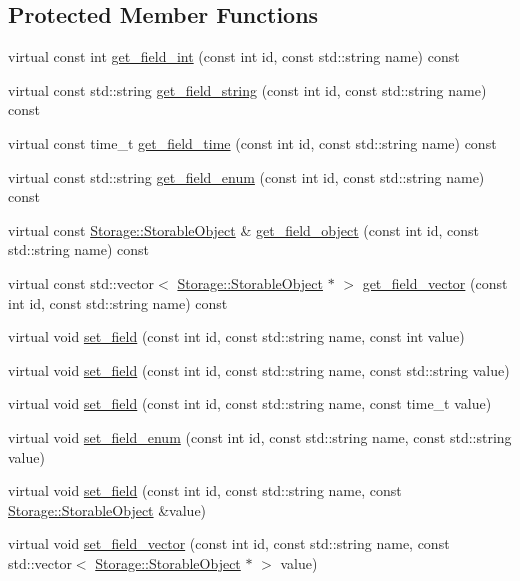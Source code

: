 \subsection*{Protected Member Functions}
\begin{DoxyCompactItemize}
\item 
virtual const int \hyperlink{classDummyStorage_a275263eba82a652005292f01a120af8e}{get\_\-field\_\-int} (const int id, const std::string name) const 
\item 
virtual const std::string \hyperlink{classDummyStorage_a410ef9d239193e25f830c49140e18293}{get\_\-field\_\-string} (const int id, const std::string name) const 
\item 
virtual const time\_\-t \hyperlink{classDummyStorage_a978ef9d688175e3739bb478f4c9b5313}{get\_\-field\_\-time} (const int id, const std::string name) const 
\item 
virtual const std::string \hyperlink{classDummyStorage_a1101739c23fbf79b009558553180ef1a}{get\_\-field\_\-enum} (const int id, const std::string name) const 
\item 
virtual const \hyperlink{classStorage_1_1StorableObject}{Storage::StorableObject} \& \hyperlink{classDummyStorage_a62ead126a3be7736995227fcb3a7e5cd}{get\_\-field\_\-object} (const int id, const std::string name) const 
\item 
virtual const std::vector$<$ \hyperlink{classStorage_1_1StorableObject}{Storage::StorableObject} $\ast$ $>$ \hyperlink{classDummyStorage_afe36af3f3147027ebb6447192201c790}{get\_\-field\_\-vector} (const int id, const std::string name) const 
\item 
virtual void \hyperlink{classDummyStorage_ab22488d00b8969af5356bc344672bd18}{set\_\-field} (const int id, const std::string name, const int value)
\item 
virtual void \hyperlink{classDummyStorage_aaa0d3249ea3207fae78253b191b80854}{set\_\-field} (const int id, const std::string name, const std::string value)
\item 
virtual void \hyperlink{classDummyStorage_a51662a853e821fda1828e8756d58f1df}{set\_\-field} (const int id, const std::string name, const time\_\-t value)
\item 
virtual void \hyperlink{classDummyStorage_a0655a6f7c822adbe174d1c7fe7c9ea34}{set\_\-field\_\-enum} (const int id, const std::string name, const std::string value)
\item 
virtual void \hyperlink{classDummyStorage_ac1674d9c4106af70139f4672a8702285}{set\_\-field} (const int id, const std::string name, const \hyperlink{classStorage_1_1StorableObject}{Storage::StorableObject} \&value)
\item 
virtual void \hyperlink{classDummyStorage_a6102ef89119b0ee1525439b3fd7043ce}{set\_\-field\_\-vector} (const int id, const std::string name, const std::vector$<$ \hyperlink{classStorage_1_1StorableObject}{Storage::StorableObject} $\ast$ $>$ value)
\end{DoxyCompactItemize}


